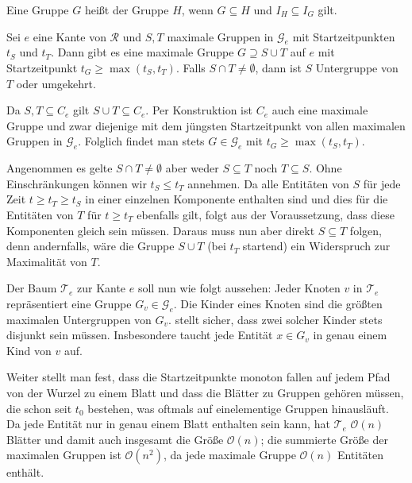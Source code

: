 \begin{definition}[{name=[Untergruppe]}]
	Eine Gruppe $G$ heißt  der Gruppe $H$, wenn $G \subseteq H$ und $I_H \subseteq I_G$ gilt.
\end{definition}

\begin{lemma}[{name={\cite[Lem.~8]{buchin2015}}},label=lem:untergruppen]
	Sei $e$ eine Kante von $\mathcal{R}$ und $S,T$ maximale Gruppen in $\mathcal{G}_e$ mit Startzeitpunkten $t_S$ und $t_T$.
	Dann gibt es eine maximale Gruppe $G \supseteq S \cup T$ auf $e$ mit Startzeitpunkt $t_G \ge \max(t_S,t_T)$.
	Falls $S \cap T \neq \emptyset$, dann ist $S$ Untergruppe von $T$ oder umgekehrt.
\end{lemma}
\begin{beweis}
	Da $S,T \subseteq C_e$ gilt $S \cup T \subseteq C_e$.
	Per Konstruktion ist $C_e$ auch eine maximale Gruppe und zwar diejenige mit dem jüngsten Startzeitpunkt von allen maximalen Gruppen in $\mathcal{G}_e$.
	Folglich findet man stets $G \in \mathcal{G}_e$ mit $t_G \ge \max(t_S,t_T)$.
	
	Angenommen es gelte $S \cap T \neq \emptyset$ aber weder $S \subseteq T$ noch $T \subseteq S$.
	Ohne Einschränkungen können wir $t_S \le t_T$ annehmen.
	Da alle Entitäten von $S$ für jede Zeit $t \ge t_T \ge t_S$ in einer einzelnen Komponente enthalten sind und dies für die Entitäten von $T$ für $t \ge t_T$ ebenfalls gilt, folgt aus der Voraussetzung, dass diese Komponenten gleich sein müssen.
	Daraus muss nun aber direkt $S \subseteq T $ folgen, denn andernfalls, wäre die Gruppe $S \cup T$ (bei $t_T$ startend) ein Widerspruch zur Maximalität von $T$.
\end{beweis}

Der Baum $\mathcal{T}_e$ zur Kante $e$ soll nun wie folgt aussehen: Jeder Knoten $v$ in $\mathcal{T}_e$ repräsentiert eine Gruppe $G_v \in \mathcal{G}_e$.
Die Kinder eines Knoten sind die größten maximalen Untergruppen von $G_v$.
 stellt sicher, dass zwei solcher Kinder stets disjunkt sein müssen.
Insbesondere taucht jede Entität $x \in G_v$ in genau einem Kind von $v$ auf.

Weiter stellt man fest, dass die Startzeitpunkte monoton fallen auf jedem Pfad von der Wurzel zu einem Blatt und dass die Blätter zu Gruppen gehören müssen, die schon seit $t_0$ bestehen, was oftmals auf einelementige Gruppen hinausläuft.
Da jede Entität nur in genau einem Blatt enthalten sein kann, hat $\mathcal{T}_e$ $\mathcal{O}(n)$ Blätter und damit auch insgesamt die Größe $\mathcal{O}(n)$; die summierte Größe der maximalen Gruppen ist $\mathcal{O}(n^2)$, da jede maximale Gruppe $\mathcal{O}(n)$ Entitäten enthält.




